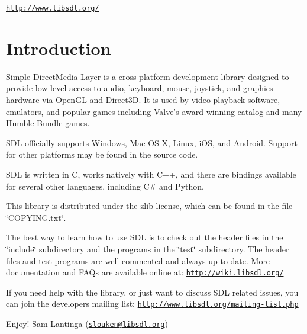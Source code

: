 \href{http://www.libsdl.org/}{\tt http\+://www.\+libsdl.\+org/}\hypertarget{index_intro_sec}{}\section{Introduction}\label{index_intro_sec}
Simple Direct\+Media Layer is a cross-\/platform development library designed to provide low level access to audio, keyboard, mouse, joystick, and graphics hardware via Open\+G\+L and Direct3\+D. It is used by video playback software, emulators, and popular games including Valve's award winning catalog and many Humble Bundle games.

S\+D\+L officially supports Windows, Mac O\+S X, Linux, i\+O\+S, and Android. Support for other platforms may be found in the source code.

S\+D\+L is written in C, works natively with C++, and there are bindings available for several other languages, including C\# and Python.

This library is distributed under the zlib license, which can be found in the file \char`\"{}\+C\+O\+P\+Y\+I\+N\+G.\+txt\char`\"{}.

The best way to learn how to use S\+D\+L is to check out the header files in the \char`\"{}include\char`\"{} subdirectory and the programs in the \char`\"{}test\char`\"{} subdirectory. The header files and test programs are well commented and always up to date. More documentation and F\+A\+Qs are available online at\+: \href{http://wiki.libsdl.org/}{\tt http\+://wiki.\+libsdl.\+org/}

If you need help with the library, or just want to discuss S\+D\+L related issues, you can join the developers mailing list\+: \href{http://www.libsdl.org/mailing-list.php}{\tt http\+://www.\+libsdl.\+org/mailing-\/list.\+php}

Enjoy! Sam Lantinga (\href{mailto:slouken@libsdl.org}{\tt slouken@libsdl.\+org}) 